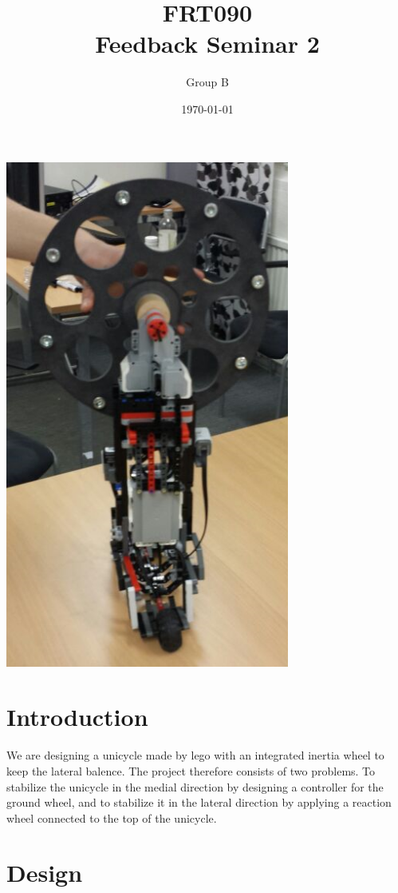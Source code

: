 \documentclass[a4paper]{article}
\title{
FRT090  \\
Feedback Seminar 2\\}
\author{Group B}
\date{\today}
\begin{document}
\maketitle



\includegraphics[width=0.7\textwidth]{inwheel}

\newpage

\section{Introduction}

We are designing a unicycle made by lego with an integrated inertia wheel to keep the lateral balence. The project therefore consists of two problems. To stabilize the unicycle in the medial direction by designing a controller for the ground wheel, and to stabilize it in the lateral direction by applying a reaction wheel connected to the top of the unicycle. 

\section{Design}
\end{document}
